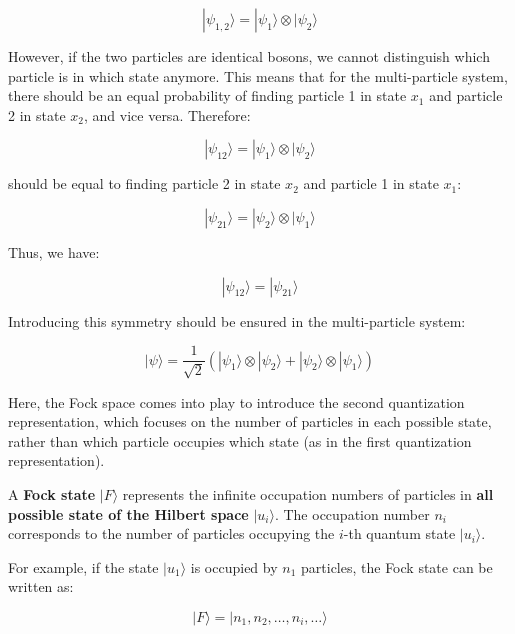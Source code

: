 \begin{equation}
|\psi_{1,2}\rangle = |\psi_1\rangle \otimes |\psi_2\rangle
\end{equation}

However, if the two particles are identical bosons, we cannot distinguish which particle is in which state anymore. This means that for the multi-particle system, there should be an equal probability of finding particle 1 in state \( x_1 \) and particle 2 in state \( x_2 \), and vice versa. Therefore:

\begin{equation}
|\psi_{12}\rangle = |\psi_1\rangle \otimes |\psi_2\rangle
\end{equation}

should be equal to finding particle 2 in state \( x_2 \) and particle 1 in state \( x_1 \):

\begin{equation}
|\psi_{21}\rangle = |\psi_2\rangle \otimes |\psi_1\rangle
\end{equation}

Thus, we have:

\begin{equation}
|\psi_{12}\rangle = |\psi_{21}\rangle
\end{equation}

Introducing this symmetry should be ensured in the multi-particle system:

\begin{equation}
|\psi\rangle = \frac{1}{\sqrt{2}} \left( |\psi_1\rangle \otimes |\psi_2\rangle + |\psi_2\rangle \otimes |\psi_1\rangle \right)
\end{equation}

Here, the Fock space comes into play to introduce the second quantization representation, which focuses on the number of particles in each possible state, rather than which particle occupies which state (as in the first quantization representation).

A \textbf{Fock state} \( |F\rangle \) represents the infinite occupation numbers of particles in \textbf{all possible state of the Hilbert space} \( |u_i\rangle \). The occupation number \( n_i \) corresponds to the number of particles occupying the \( i \)-th quantum state \( |u_i\rangle \).

For example, if the state \( |u_1\rangle \) is occupied by \( n_1 \) particles, the Fock state can be written as:

\begin{equation}
|F\rangle = |n_1, n_2, \dots, n_i, \dots \rangle
\end{equation}

